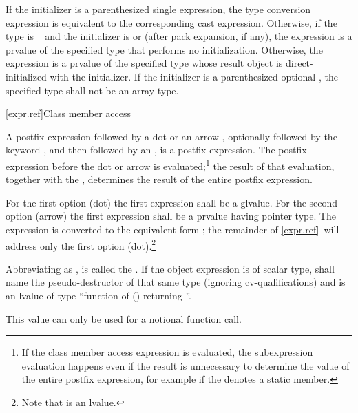 \pnum
If the initializer is a parenthesized single expression,
the type conversion expression is equivalent
to the corresponding cast
expression.
%
Otherwise, if the type is \cv{}~
and the initializer is \tcode{()} or \tcode{\{\}}
(after pack expansion, if any),
the expression is a prvalue of the specified type
that performs no initialization.
Otherwise,
the expression is a prvalue of the specified type
whose result object is direct-initialized
with the initializer.
If the initializer is a parenthesized optional ,
the specified type shall not be an array type.

[expr.ref]{Class member access}

\pnum
{}%
%
%
%
%
%
%
%
%
%
A postfix expression followed by a dot  or an arrow \tcode{->},
optionally followed by the keyword
, and then followed by an
, is a postfix expression. The postfix
expression before the dot or arrow is evaluated;\footnote{If the class member
access expression is evaluated, the subexpression evaluation happens even if the
result is unnecessary to determine
the value of the entire postfix expression, for example if the
 denotes a static member.}
the result of that evaluation, together with the
, determines the result of the entire postfix
expression.

\pnum
{}%
For the first option (dot) the first expression shall be a glvalue.
For the second option (arrow) the first expression
shall be a prvalue having pointer type.
The expression  is
converted to the equivalent form ; the remainder of
\ref{expr.ref}~will address only the first option (dot).\footnote{Note that
 is an lvalue.}

\pnum
Abbreviating
as ,  is called the .
If the object expression is of scalar type,
 shall name the pseudo-destructor
of that same type (ignoring cv-qualifications) and
 is an lvalue of type ``function of () returning ''.
\begin{note}
This value can only be used
for a notional function call.
\end{note}


